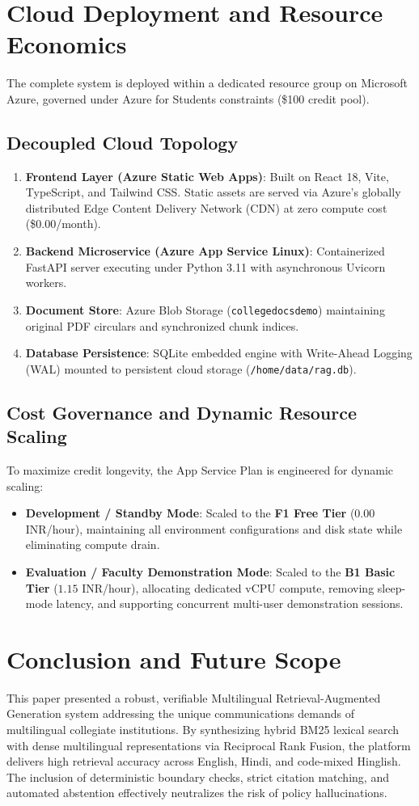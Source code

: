 \documentclass[conference]{IEEEtran}
\begin{document}
\section{Cloud Deployment and Resource Economics}
The complete system is deployed within a dedicated resource group on Microsoft Azure, governed under Azure for Students constraints (\$100 credit pool).

\subsection{Decoupled Cloud Topology}
\begin{enumerate}
    \item \textbf{Frontend Layer (Azure Static Web Apps)}: Built on React 18, Vite, TypeScript, and Tailwind CSS. Static assets are served via Azure's globally distributed Edge Content Delivery Network (CDN) at zero compute cost (\$0.00/month).
    \item \textbf{Backend Microservice (Azure App Service Linux)}: Containerized FastAPI server executing under Python 3.11 with asynchronous Uvicorn workers.
    \item \textbf{Document Store}: Azure Blob Storage (\texttt{collegedocsdemo}) maintaining original PDF circulars and synchronized chunk indices.
    \item \textbf{Database Persistence}: SQLite embedded engine with Write-Ahead Logging (WAL) mounted to persistent cloud storage (\texttt{/home/data/rag.db}).
\end{enumerate}

\subsection{Cost Governance and Dynamic Resource Scaling}
To maximize credit longevity, the App Service Plan is engineered for dynamic scaling:
\begin{itemize}
    \item \textbf{Development / Standby Mode}: Scaled to the \textbf{F1 Free Tier} ($0.00$ INR/hour), maintaining all environment configurations and disk state while eliminating compute drain.
    \item \textbf{Evaluation / Faculty Demonstration Mode}: Scaled to the \textbf{B1 Basic Tier} ($1.15$ INR/hour), allocating dedicated vCPU compute, removing sleep-mode latency, and supporting concurrent multi-user demonstration sessions.
\end{itemize}

\section{Conclusion and Future Scope}
This paper presented a robust, verifiable Multilingual Retrieval-Augmented Generation system addressing the unique communications demands of multilingual collegiate institutions. By synthesizing hybrid BM25 lexical search with dense multilingual representations via Reciprocal Rank Fusion, the platform delivers high retrieval accuracy across English, Hindi, and code-mixed Hinglish. The inclusion of deterministic boundary checks, strict citation matching, and automated abstention effectively neutralizes the risk of policy hallucinations.
\end{document}
